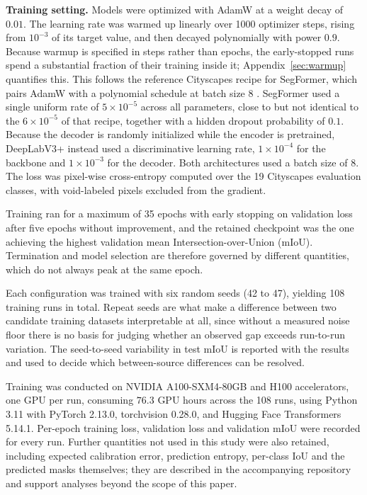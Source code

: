 \documentclass[conference]{IEEEtran}
\begin{document}
\textbf{Training setting.} Models were optimized with AdamW at a weight decay of $0.01$. The learning rate was warmed up linearly over 1000 optimizer steps, rising from $10^{-3}$ of its target value, and then decayed polynomially with power $0.9$. Because warmup is specified in steps rather than epochs, the early-stopped runs spend a substantial fraction of their training inside it; Appendix~\ref{sec:warmup} quantifies this. This follows the reference Cityscapes recipe for SegFormer, which pairs AdamW with a polynomial schedule at batch size 8 \cite{xie2021segformer}. SegFormer used a single uniform rate of $5 \times 10^{-5}$ across all parameters, close to but not identical to the $6 \times 10^{-5}$ of that recipe, together with a hidden dropout probability of $0.1$. Because the decoder is randomly initialized while the encoder is pretrained, DeepLabV3+ instead used a discriminative learning rate, $1 \times 10^{-4}$ for the backbone and $1 \times 10^{-3}$ for the decoder. Both architectures used a batch size of $8$. The loss was pixel-wise cross-entropy computed over the 19 Cityscapes evaluation classes, with void-labeled pixels excluded from the gradient.

Training ran for a maximum of 35 epochs with early stopping on validation loss after five epochs without improvement, and the retained checkpoint was the one achieving the highest validation mean Intersection-over-Union (mIoU). Termination and model selection are therefore governed by different quantities, which do not always peak at the same epoch.

Each configuration was trained with six random seeds (42 to 47), yielding 108 training runs in total. Repeat seeds are what make a difference between two candidate training datasets interpretable at all, since without a measured noise floor there is no basis for judging whether an observed gap exceeds run-to-run variation. The seed-to-seed variability in test mIoU is reported with the results and used to decide which between-source differences can be resolved.

Training was conducted on NVIDIA A100-SXM4-80GB and H100 accelerators, one GPU per run, consuming $76.3$ GPU hours across the 108 runs, using Python 3.11 with PyTorch 2.13.0, torchvision 0.28.0, and Hugging Face Transformers 5.14.1. Per-epoch training loss, validation loss and validation mIoU were recorded for every run. Further quantities not used in this study were also retained, including expected calibration error, prediction entropy, per-class IoU and the predicted masks themselves; they are described in the accompanying repository and support analyses beyond the scope of this paper.
\end{document}
